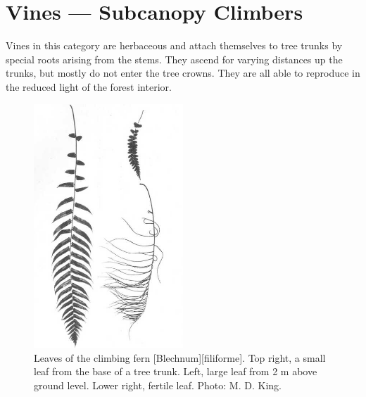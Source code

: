 \section{Vines --- Subcanopy Climbers}

Vines in this category are herbaceous and attach themselves to tree trunks by special roots arising from the stems.
They ascend for varying distances up the trunks, but mostly do not enter the tree crowns.
They are all able to reproduce in the reduced light of the forest interior.

\begin{figure}
	\includegraphics[width=0.5\textwidth]{graphics/figure27fern.jpg}
	\centering
	\caption[Leaves of the climbing fern \emph{Blechnum filiforme}]{Leaves of the climbing fern [Blechnum][filiforme].
	Top right, a small leaf from the base of a tree trunk.
	Left, large leaf from 2 m above ground level.
	Lower right, fertile leaf.
	Photo: M. D. King.}%
	\label{fig:27fern}
\end{figure}

